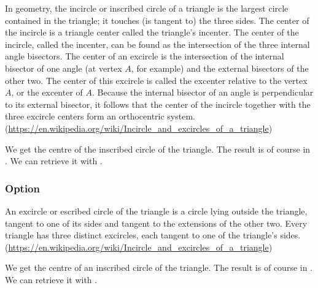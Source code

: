 In geometry, the incircle or inscribed circle of a triangle is the largest
circle contained in the triangle; it touches (is tangent to) the three sides.
The center of the incircle is a triangle center called the triangle's incenter.
The center of the incircle, called the incenter, can be found as the
intersection of the three internal angle bisectors. The center of an excircle is
the intersection of the internal bisector of one angle (at vertex $A$, for
example) and the external bisectors of the other two. The center of this
excircle is called the excenter relative to the vertex $A$, or the excenter of
$A$. Because the internal bisector of an angle is perpendicular to its external
bisector, it follows that the center of the incircle together with the three
excircle centers form an orthocentric
system.(\url{https://en.wikipedia.org/wiki/Incircle_and_excircles_of_a_triangle})

\medskip

We get the centre of the inscribed circle of the triangle. The result is of
course in . We can retrieve it with .

\begin{tkzexample}[latex=6cm,small]
\end{tkzexample}

\newpage

\subsubsection{Option }

An excircle or escribed circle of the triangle is a circle lying outside the
triangle, tangent to one of its sides and tangent to the extensions of the other
two. Every triangle has three distinct excircles, each tangent to one of the
triangle's sides.
(\url{https://en.wikipedia.org/wiki/Incircle_and_excircles_of_a_triangle})

We get the centre of an inscribed circle of the triangle. The result is of
course in . We can retrieve it with .

